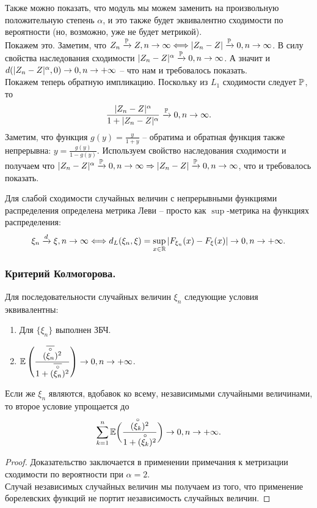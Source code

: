 \begin{note}
    Также можно показать, что модуль мы можем заменить на произвольную положительную степень $\alpha$, и это также будет эквивалентно сходимости по вероятности (но, возможно, уже не будет метрикой). \\
    Покажем это.
    Заметим, что $Z_n \xrightarrow{\P} Z, n \ra \infty \Longleftrightarrow |Z_n - Z| \xrightarrow{\P} 0, n \ra \infty$.
    В силу свойства наследования сходимости $|Z_n - Z|^\alpha \xrightarrow{\P} 0, n \ra \infty$.
    А значит и $d(|Z_n - Z|^\alpha, 0) \ra 0, n \ra +\infty$ -- что нам и требовалось показать. \\
    Покажем теперь обратную импликацию. Поскольку из $L_1$ сходимости следует $\P$, то
    \[
        \dfrac{|Z_n - Z|^\alpha}{1 + |Z_n - Z|^\alpha} \xrightarrow{\P} 0, n \ra \infty.
    \]
    Заметим, что функция $g(y) = \frac{y}{1 + y}$ -- обратима и обратная функция также непрерывна: $y = \frac{g(y)}{1 - g(y)}$.
    Используем свойство наследования сходимости и получаем что $|Z_n - Z|^\alpha \xrightarrow{\P} 0, n \ra \infty \Ra |Z_n - Z|\xrightarrow{\P} 0, n \ra \infty$, что и требовалось показать.
\end{note}
\begin{note}
    Для слабой сходимости случайных величин с непрерывными функциями распределения определена метрика Леви -- просто как $\sup$-метрика на функциях распределения:
    \[
        \xi_n \xrightarrow{d} \xi, n \ra \infty \Longleftrightarrow d_L(\xi_n, \xi) = \sup\limits_{x \in \R} |F_{\xi_n}(x) - F_{\xi}(x)| \ra 0, n \ra +\infty.
    \]
\end{note}
\subsubsection{Критерий Колмогорова.}
\begin{theorem}
    Для последовательности случайных величин $\xi_n$ следующие условия эквивалентны:
    \begin{enumerate}
        \item Для $\{\xi_n\}$ выполнен ЗБЧ.
        \item $\Ex \left( \dfrac{(\overline{\overset{\circ}{\xi_n}})^2}{1 + (\overline{\overset{\circ}{\xi_n}})^2}\right) \ra 0, n \ra +\infty$.
    \end{enumerate}
    Если же $\xi_n$ являются, вдобавок ко всему, независимыми случайными величинами, то второе условие упрощается до
    \[
        \sum\limits_{k = 1}^{n} \Ex \biggr(\dfrac{ (\overset{\circ}{\xi_k})^2}{1 + (\overset{\circ}{\xi_k})^2}\biggr) \ra 0, n \ra +\infty.
    \]
\end{theorem}
\begin{proof}
    Доказательство заключается в применении примечания к метризации сходимости по вероятности при $\alpha = 2$. \\
    Случай независимых случайных величин мы получаем из того, что применение борелевских функций не портит независимость случайных величин.
\end{proof}
